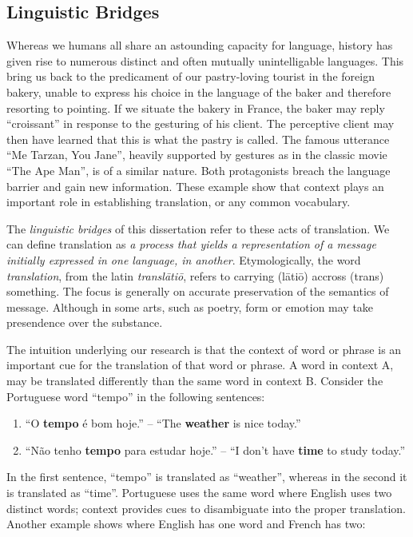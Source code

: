 \subsection{Linguistic Bridges}
\label{sec:bridges}

Whereas we humans all share an astounding capacity for language, history has
given rise to numerous distinct and often mutually unintelligable languages.
This bring us back to the predicament of our pastry-loving tourist in the
foreign bakery, unable to express his choice in the language of the baker and
therefore resorting to pointing. If we situate the bakery in France, the baker
may reply ``croissant'' in response to the gesturing of his client. The
perceptive client may then have learned that this is what the pastry is called.
The famous utterance ``Me Tarzan, You Jane'', heavily supported by gestures as
in the classic movie ``The Ape Man'', is of a similar nature. Both protagonists
breach the language barrier and gain new information. These example show that
context plays an important role in establishing translation, or any common
vocabulary. 

The \emph{linguistic bridges} of this dissertation refer to these acts of
translation. We can define translation as \emph{a process that yields a
representation of a message initially expressed in one language, in another}.
Etymologically, the word \emph{translation}, from the latin \emph{transl\=ati\=o},
refers to carrying (l\=ati\=o) accross (trans) something. The focus is generally on
accurate preservation of the semantics of message.  Although in some arts, such
as poetry, form or emotion may take presendence over the substance.

The intuition underlying our research is that the context of word or phrase is
an important cue for the translation of that word or phrase. A word in context
A, may be translated differently than the same word in context B. Consider the
Portuguese word ``tempo'' in the following sentences:

\begin{enumerate}
\item ``O \textbf{tempo} é bom hoje.'' -- ``The \textbf{weather} is nice today.''
\item ``Não tenho \textbf{tempo} para estudar hoje.'' -- ``I don't have \textbf{time} to study today.''
\end{enumerate}

In the first sentence, ``tempo'' is translated as ``weather'', whereas in the
second it is translated as ``time''. Portuguese uses the same word where
English uses two distinct words; context provides cues to disambiguate into the
proper translation. Another example shows where English has one word and French has two:

